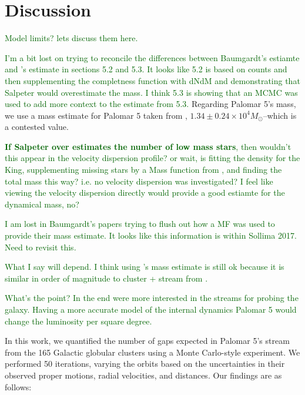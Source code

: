 \documentclass{aa}
\newcommand{\salvatore}[1]{\textcolor{darkgreen}{{#1}}}
\begin{document}
\section{Discussion}


  \salvatore{Model limits? lets discuss them here.}


  \salvatore{I'm a bit lost on trying to reconcile the differences between Baumgardt's estiamte and \citet{2017ApJ...842..120I}'s estimate in sections 5.2 and 5.3. It looks like 5.2 is based on counts and then supplementing the completness function with dNdM \citet{2001AJ....122.3231G} and demonstrating that Salpeter would overestimate the mass. I think 5.3 is showing that an MCMC was used to add more context to the estimate from 5.3.}  Regarding Palomar 5's mass, we use a mass estimate for Palomar 5 taken from \citet{2021MNRAS.505.5957B}, $1.34\pm0.24\times10^{4}M_{\odot}$--which is a contested value. 

    
  \salvatore{\textbf{If Salpeter over estimates the number of low mass stars}, then wouldn't this appear in the velocity dispersion profile? or wait, is \citet{2017ApJ...842..120I} fitting the density for the King, supplementing missing stars by a Mass function from \citet{2001AJ....122.3231G}, and finding the total mass this way? i.e. no velocity dispersion was investigated? I feel like viewing the velocity dispersion directly would provide a good estiamte for the dynamical mass, no?}
  
  \salvatore{I am lost in Baumgardt's papers trying to flush out how a MF was used to provide their mass estimate. It looks like this information is within Sollima 2017. Need to revisit this. }

  \salvatore{What I say will depend. I think using \citet{2021MNRAS.505.5957B}'s mass estimate is still ok because it is similar in order of magnitude to cluster + stream from \citet{2017ApJ...842..120I}. }

  \salvatore{What's the point? In the end were more interested in the streams for probing the galaxy. Having a more accurate model of the internal dynamics Palomar 5 would change the luminosity per square degree. }


  In this work, we quantified the number of gaps expected in Palomar 5's stream from the 165 Galactic globular clusters using a Monte Carlo-style experiment. We performed 50 iterations, varying the orbits based on the uncertainties in their observed proper motions, radial velocities, and distances. Our findings are as follows:
\end{document}

